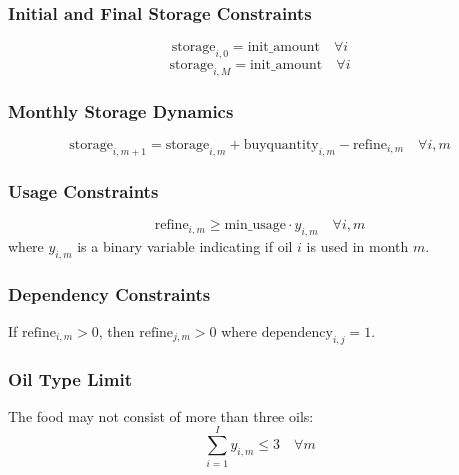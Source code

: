 \documentclass{article}
\begin{document}
\subsubsection*{Initial and Final Storage Constraints}
\[
\text{storage}_{i,0} = \text{init\_amount} \quad \forall i 
\]
\[
\text{storage}_{i,M} = \text{init\_amount} \quad \forall i 
\]

\subsubsection*{Monthly Storage Dynamics}
\[
\text{storage}_{i,m+1} = \text{storage}_{i,m} + \text{buyquantity}_{i,m} - \text{refine}_{i,m} \quad \forall i, m
\]

\subsubsection*{Usage Constraints}
\[
\text{refine}_{i,m} \geq \text{min\_usage} \cdot y_{i,m} \quad \forall i, m
\]
where \( y_{i,m} \) is a binary variable indicating if oil \( i \) is used in month \( m \).

\subsubsection*{Dependency Constraints}
If \( \text{refine}_{i,m} > 0 \), then \( \text{refine}_{j,m} > 0 \) where \( \text{dependency}_{i,j} = 1 \).

\subsubsection*{Oil Type Limit}
The food may not consist of more than three oils:
\[
\sum_{i=1}^{I} y_{i,m} \leq 3 \quad \forall m
\]
\end{document}
